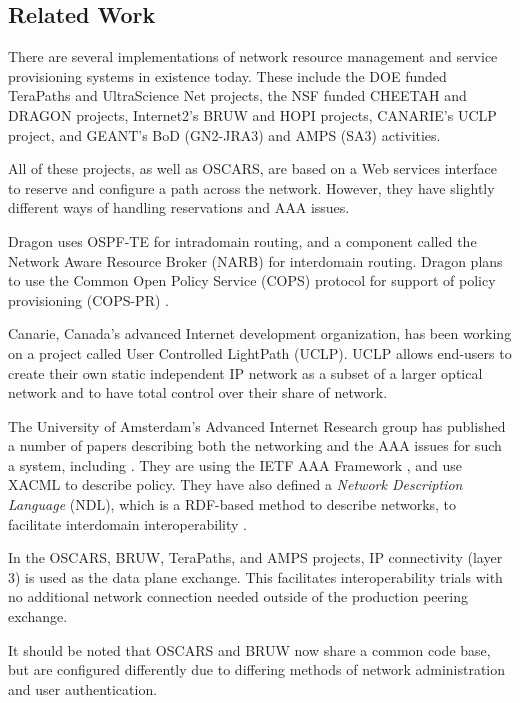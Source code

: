 \documentclass[conference]{IEEEtran}
\begin{document}
\subsection{Related Work}

There are several implementations of network resource management and
service provisioning systems in existence today.  These include the DOE funded
TeraPaths \cite{TeraPaths} and UltraScience Net \cite{usn} projects, the NSF funded CHEETAH \cite{CHEETAH} and
DRAGON \cite{yang} projects,
Internet2's BRUW \cite{riddle} and HOPI \cite{hopi} projects, CANARIE's UCLP \cite{Canarie} 
project, and GEANT's
BoD (GN2-JRA3) \cite{geant} and AMPS (SA3) \cite{geant-amps} activities.

All of these projects, as well as OSCARS, are based on a Web services 
interface to reserve and configure a path across the network. However, they 
have slightly different ways of handling reservations and AAA issues.

Dragon uses OSPF-TE \cite{ospf-te} for intradomain routing, and a component called
the Network Aware Resource Broker (NARB) for interdomain routing.
Dragon plans to use the Common Open Policy Service (COPS) \cite{cops}
protocol for support of policy provisioning (COPS-PR) \cite{cops-pr}.

Canarie, Canada's advanced Internet development organization, has been
working on a project called User Controlled LightPath (UCLP).  UCLP
allows end-users to create their own static independent IP network as a subset
of a larger optical network and to have total control over their share
of network.

The University of Amsterdam's Advanced Internet Research group has
published a number of papers
describing both the networking and the AAA issues for such a system,
including \cite{gommans05} \cite{gommans06} \cite{demchenko} . 
They are using the IETF AAA Framework
\cite{AAA}, and use XACML \cite{XACML} to describe policy. They have also defined a
\emph{Network Description Language} (NDL), which is a RDF-based method to
describe networks, to facilitate interdomain interoperability \cite{ndl}.

In the OSCARS, BRUW, TeraPaths, and AMPS projects, IP connectivity (layer
3) is used as the data plane exchange.  This facilitates interoperability
trials with no additional network connection needed outside of the production
peering exchange.

It should be noted that OSCARS and BRUW now share a common code base, but
are configured differently due to differing methods of network administration
and user authentication.
\end{document}
